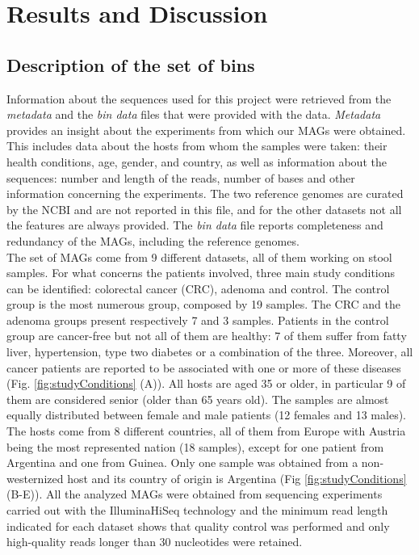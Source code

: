 \section*{Results and Discussion}

\graphicspath{{../Rscript/CMG_Rscript_files/figure-gfm/}}

\subsection*{Description of the set of bins}

Information about the sequences used for this project were retrieved from the \textit{metadata} and the \textit{bin data} files that were provided with the data. \textit{Metadata} provides an insight about the experiments from which our MAGs were obtained. This includes data about the hosts from whom the samples were taken: their health conditions, age, gender, and country, as well as information about the sequences: number and length of the reads, number of bases and other information concerning the experiments. The two reference genomes are curated by the NCBI and are not reported in this file, and for the other datasets not all the features are always provided. The \textit{bin data} file reports completeness and redundancy of the MAGs, including the reference genomes.\\

The set of MAGs come from 9 different datasets, all of them working on stool samples. For what concerns the patients involved, three main study conditions can be identified: colorectal cancer (CRC), adenoma and control. The control group is the most numerous group, composed by 19 samples. The CRC and the adenoma groups present respectively 7 and 3 samples. Patients in the control group are cancer-free but not all of them are healthy: 7 of them suffer from fatty liver, hypertension, type two diabetes or a combination of the three. Moreover, all cancer patients are reported to be associated with one or more of these diseases (Fig. \ref{fig:studyConditions} (A)). All hosts are aged 35 or older, in particular 9 of them are considered senior (older than 65 years old). The samples are almost equally distributed between female and male patients (12 females and 13 males). The hosts come from 8 different countries, all of them from Europe with Austria being the most represented nation (18 samples), except for one patient from Argentina and one from Guinea. Only one sample was obtained from a non-westernized host and its country of origin is Argentina (Fig \ref{fig:studyConditions} (B-E)). All the analyzed MAGs were obtained from sequencing experiments carried out with the IlluminaHiSeq technology and the minimum read length indicated for each dataset shows that quality control was performed and only high-quality reads longer than 30 nucleotides were retained.\\

